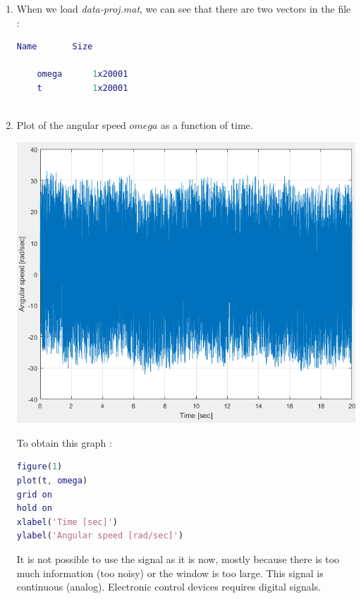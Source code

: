 \documentclass[a4paper,12pt]{article}
\begin{document}
\begin{enumerate}[label={\color{blue}\arabic*)}]

    \item 
    When we load \textit{data-proj.mat}, we can see that there are two vectors in the file : 
    \begin{lstlisting}[style=Matlab-editor,language=Matlab]
    Name       Size       
    
    omega      1x20001            
    t          1x20001
  
    \end{lstlisting}
    
    \item 
    Plot of the angular speed \(omega\) as a function of time.
    
    \begin{multicols}{2}
    
        \begin{flushleft}
            \includegraphics[scale=0.35]{Images/Figure 1.png}
            \label{Figure1}
        \end{flushleft}
        
    \columnbreak
    
    To obtain this graph :
    
    \begin{lstlisting}[style=Matlab-editor,language=Matlab, basicstyle=\small\ttfamily]
figure(1)
plot(t, omega)
grid on
hold on
xlabel('Time [sec]')
ylabel('Angular speed [rad/sec]')
        \end{lstlisting}
        
    \end{multicols}
    
    It is not possible to use the signal as it is now, mostly because there is too much information (too noisy) or the window is too large. This signal is continuous (analog). Electronic control devices requires digital signals.
    
\end{enumerate}
\end{document}
